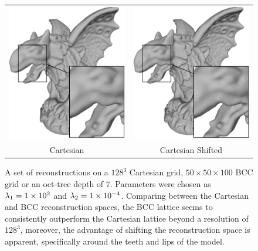 \begin{figure}
\begin{tabular}{c c}
		\includegraphics[width=0.49\linewidth,natwidth=750,natheight=750]{images/gargoyle/cc.eps} &
		\includegraphics[width=0.49\linewidth,natwidth=750,natheight=750]{images/gargoyle/ccs.eps}  \\
		Cartesian & Cartesian Shifted 
	\end{tabular}
	\caption{A set of reconstructions on a $128^3$ Cartesian grid, $50\times50\times100$ BCC grid or an oct-tree depth of 7. Parameters were chosen as $\lambda_1 = 1\times 10^{2}$ and $\lambda_2 = 1\times 10^{-4}$. Comparing between the Cartesian and BCC reconstruction spaces, the BCC lattice seems to consistently outperform the Cartesian lattice beyond a resolution of $128^3$, moreover, the advantage of shifting the reconstruction space is apparent, specifically around the teeth and lips of the model.}
	\label{fig:r1}
\end{figure}

